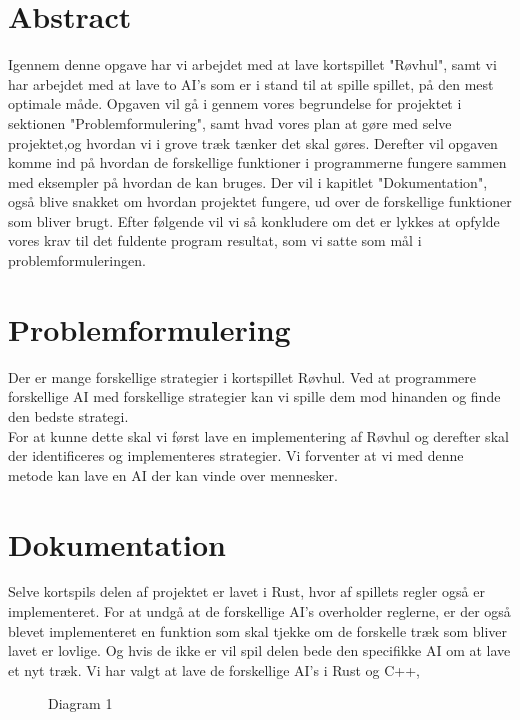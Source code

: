 \documentclass[a4paper, 12pt]{article}
\begin{document}
\section{Abstract}

Igennem denne opgave har vi arbejdet med at lave kortspillet "Røvhul", samt vi har arbejdet med at lave to AI's som er i stand til at spille spillet, på den mest optimale måde. Opgaven vil gå i gennem vores begrundelse for projektet i sektionen "Problemformulering", samt hvad vores plan at gøre med selve projektet,og hvordan vi i grove træk tænker det skal gøres.
\bigbreak
Derefter vil opgaven komme ind på hvordan de forskellige funktioner i programmerne fungere sammen med eksempler på hvordan de kan bruges. Der vil i kapitlet "Dokumentation", også blive snakket om hvordan projektet fungere, ud over de forskellige funktioner som bliver brugt. Efter følgende vil vi så konkludere om det er lykkes at opfylde vores krav til det fuldente program resultat, som vi satte som mål i problemformuleringen.

\section{Problemformulering}

Der er mange forskellige strategier i kortspillet Røvhul. Ved at programmere forskellige AI med forskellige strategier kan vi spille dem mod hinanden og finde den bedste strategi.
\\
For at kunne dette skal vi først lave en implementering af Røvhul og derefter skal der identificeres og implementeres strategier. Vi forventer at vi med denne metode kan lave en AI der kan vinde over mennesker.

\vfill
\pagebreak

\section{Dokumentation}
Selve kortspils delen af projektet er lavet i Rust, hvor af spillets regler også er implementeret. For at undgå at de forskellige AI's overholder reglerne, er der også blevet implementeret en funktion som skal tjekke om de forskelle træk som bliver lavet er lovlige. Og hvis de ikke er vil spil delen bede den specifikke AI om at lave et nyt træk.
Vi har valgt at lave de forskellige AI's i Rust og C++, 

\begin{figure}[H]
	\centering
	
	\caption{Diagram 1}
\end{figure}
\end{document}
